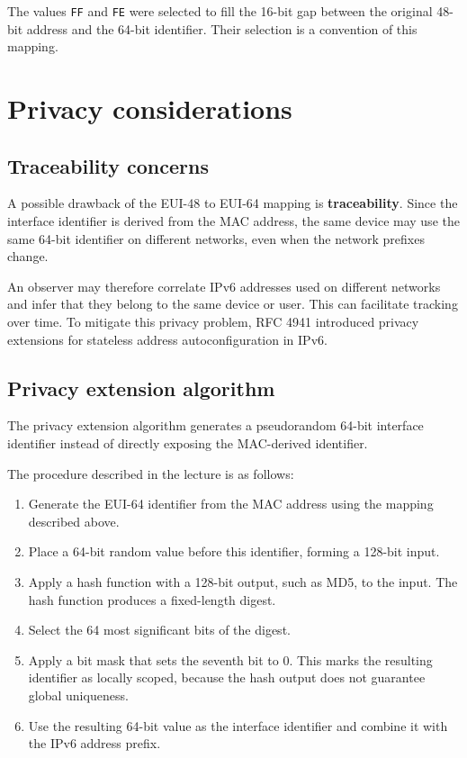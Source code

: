 \documentclass[11pt,a4paper,openany]{report}
\begin{document}
The values \texttt{FF} and \texttt{FE} were selected to fill the
16-bit gap between the original 48-bit address and the 64-bit
identifier. Their selection is a convention of this mapping.

\section{Privacy considerations}

\subsection{Traceability concerns}

A possible drawback of the EUI-48 to EUI-64 mapping is
\textbf{traceability}. Since the interface identifier is derived
from the MAC address, the same device may use the same 64-bit
identifier on different networks, even when the network prefixes
change.

An observer may therefore correlate IPv6 addresses used on different
networks and infer that they belong to the same device or user.
This can facilitate tracking over time. To mitigate this privacy
problem, RFC 4941 introduced privacy extensions for stateless address
autoconfiguration in IPv6.

\subsection{Privacy extension algorithm}

The privacy extension algorithm generates a pseudorandom
64-bit interface identifier instead of directly exposing the
MAC-derived identifier.

The procedure described in the lecture is as follows:

\begin{enumerate}
	\item Generate the EUI-64 identifier from the MAC address using
	the mapping described above.
	\item Place a 64-bit random value before this identifier, forming
	a 128-bit input.
	\item Apply a hash function with a 128-bit output, such as MD5,
	to the input. The hash function produces a fixed-length digest.
	\item Select the 64 most significant bits of the digest.
	\item Apply a bit mask that sets the seventh bit to 0. This marks
	the resulting identifier as locally scoped, because the hash
	output does not guarantee global uniqueness.
	\item Use the resulting 64-bit value as the interface identifier
	and combine it with the IPv6 address prefix.
\end{enumerate}
\end{document}

